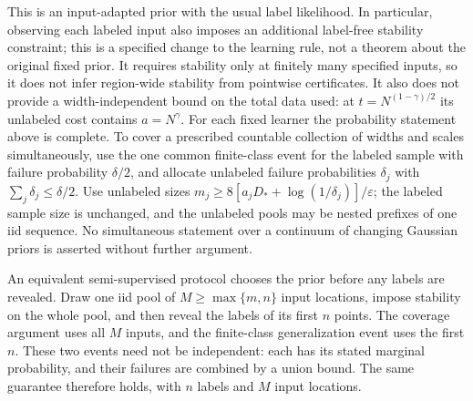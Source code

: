 This is an input-adapted prior with the usual label likelihood. In
particular, observing each labeled input also imposes an additional
label-free stability constraint; this is a specified change to the
learning rule, not a theorem about the original fixed prior. It
requires stability only at finitely many specified inputs, so it does
not infer region-wide stability from pointwise certificates. It also
does not provide a width-independent bound on the total data used:
at $t=N^{(1-\gamma)/2}$ its unlabeled cost contains $a=N^\gamma$.
For each fixed learner the probability statement above is complete.
To cover a prescribed countable collection of widths and scales
simultaneously, use the one common finite-class event for the labeled
sample with failure probability $\delta/2$, and allocate unlabeled
failure probabilities $\delta_j$ with $\sum_j\delta_j\le\delta/2$.
Use unlabeled sizes
$m_j\ge8[a_jD_*+\log(1/\delta_j)]/\varepsilon$; the labeled sample
size is unchanged, and the unlabeled pools may be nested prefixes
of one iid sequence. No
simultaneous statement over a continuum of changing Gaussian priors
is asserted without further argument.

An equivalent semi-supervised protocol chooses the prior before any
labels are revealed. Draw one iid pool of $M\ge\max\{m,n\}$ input
locations, impose stability on the whole pool, and then reveal the
labels of its first $n$ points. The coverage argument uses all $M$
inputs, and the finite-class generalization event uses the first $n$.
These two events need not be independent: each has its stated marginal
probability, and their failures are combined by a union bound. The same
guarantee therefore holds, with $n$ labels and $M$ input locations.
